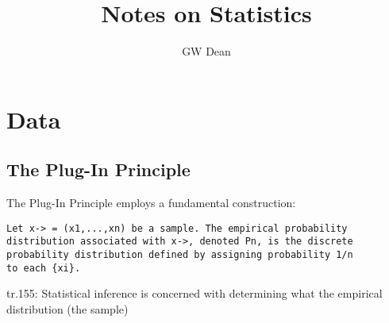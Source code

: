 \documentclass[a4paper,11pt]{article}
\author{GW Dean}
\title{Notes on Statistics}
\begin{document}
\maketitle
\tableofcontents
\section{Data}
\subsection{The Plug-In Principle}
The Plug-In Principle employs a fundamental construction:

\begin{verbatim}
Let x-> = (x1,...,xn) be a sample. The empirical probability
distribution associated with x->, denoted Pn, is the discrete
probability distribution defined by assigning probability 1/n
to each {xi}.
\end{verbatim}

tr.155: Statistical inference is concerned with determining
what the empirical distribution (the sample)
\end{document}
